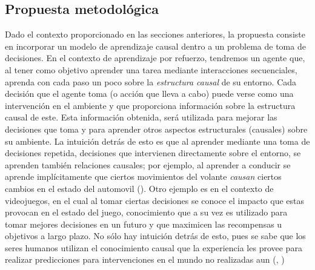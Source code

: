 \documentclass[11pt]{article}
\theoremstyle{plain}
\begin{document}
\subsection{Propuesta metodológica}
Dado el contexto proporcionado en las secciones anteriores, la propuesta consiste en incorporar un modelo de aprendizaje causal dentro a un problema de toma de decisiones. En el contexto de aprendizaje por refuerzo, tendremos un agente que, al tener como objetivo aprender una tarea mediante interacciones secuenciales, aprenda con cada paso un poco sobre la \textit{estructura causal} de su entorno. Cada decisión que el agente toma (o acción que lleva a cabo) puede verse como una intervención en el ambiente y que proporciona información sobre la estructura causal de este. Esta información obtenida, será utilizada para mejorar las decisiones que toma y para aprender otros aspectos estructurales (causales) sobre su ambiente. La intuición detrás de esto es que al aprender mediante una toma de decisiones repetida, decisiones que intervienen directamente sobre el entorno, se aprenden también relaciones causales; por ejemplo, al aprender a conducir se aprende implícitamente que ciertos movimientos del volante \textit{causan} ciertos cambios en el estado del automovil (\cite{danks2014unifying}). Otro ejemplo es en el contexto de videojuegos, en el cual al tomar ciertas decisiones se conoce el impacto que estas provocan en el estado del juego, conocimiento que a su vez es utilizado para tomar mejores decisiones en un futuro y que maximicen las recompensas u objetivos a largo plazo. No sólo hay intuición detrás de esto, pues se sabe que los seres humanos utilizan el conocimiento causal que la experiencia les provee para realizar predicciones para intervenciones en el mundo no realizadas aun (\cite{meder2008inferring}, \cite{hagmayer2009decision})\\
\end{document}
